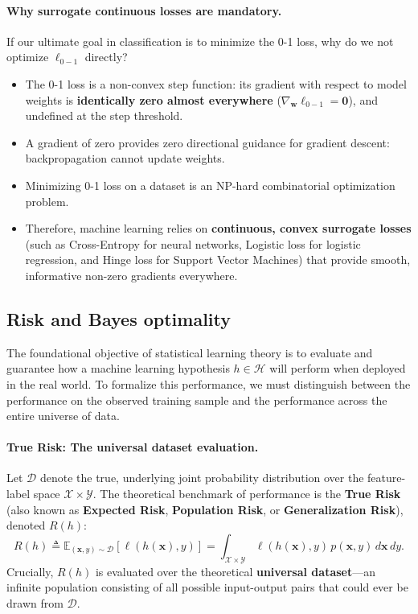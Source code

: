 \paragraph{Why surrogate continuous losses are mandatory.}
If our ultimate goal in classification is to minimize the 0-1 loss, why do we not optimize $\ell_{0-1}$ directly?
\begin{itemize}[noitemsep]
  \item The 0-1 loss is a non-convex step function: its gradient with respect to model weights is \textbf{identically zero almost everywhere} ($\nabla_{\mathbf{w}} \ell_{0-1} = \mathbf{0}$), and undefined at the step threshold.
  \item A gradient of zero provides zero directional guidance for gradient descent: backpropagation cannot update weights.
  \item Minimizing 0-1 loss on a dataset is an NP-hard combinatorial optimization problem.
  \item Therefore, machine learning relies on \textbf{continuous, convex surrogate losses} (such as Cross-Entropy for neural networks, Logistic loss for logistic regression, and Hinge loss for Support Vector Machines) that provide smooth, informative non-zero gradients everywhere.
\end{itemize}

\subsection{Risk and Bayes optimality}
\label{sec:true_risk_and_bayes_optimal}

The foundational objective of statistical learning theory is to evaluate and guarantee how a machine learning hypothesis $h \in \mathcal{H}$ will perform when deployed in the real world. To formalize this performance, we must distinguish between the performance on the observed training sample and the performance across the entire universe of data.

\paragraph{True Risk: The universal dataset evaluation.}
Let $\mathcal{D}$ denote the true, underlying joint probability distribution over the feature-label space $\mathcal{X} \times \mathcal{Y}$. The theoretical benchmark of performance is the \textbf{True Risk} (also known as \textbf{Expected Risk}, \textbf{Population Risk}, or \textbf{Generalization Risk}), denoted $R(h)$:
\begin{equation}
R(h) \triangleq \mathbb{E}_{(\mathbf{x}, y) \sim \mathcal{D}}[\ell(h(\mathbf{x}), y)] = \int_{\mathcal{X} \times \mathcal{Y}} \ell(h(\mathbf{x}), y) \, p(\mathbf{x}, y) \, d\mathbf{x} \, dy.
\label{eq:true_risk_definition}
\end{equation}
Crucially, $R(h)$ is evaluated over the theoretical \textbf{universal dataset}—an infinite population consisting of all possible input-output pairs that could ever be drawn from $\mathcal{D}$. 

